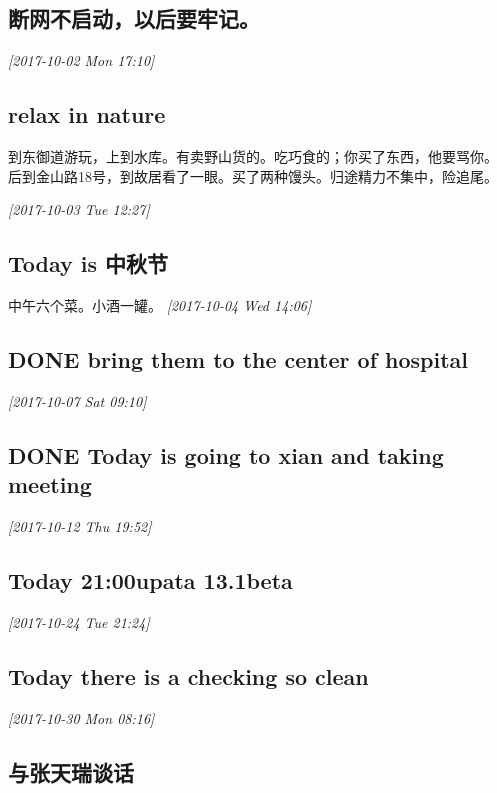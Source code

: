 \documentclass[11pt]{ctexart}
\begin{document}
\subsection{断网不启动，以后要牢记。}
\label{sec:orgc4bcf00}

\textit{[2017-10-02 Mon 17:10]}

\subsection{relax in nature}
\label{sec:org3a22ecf}
到东御道游玩，上到水库。有卖野山货的。吃巧食的；你买了东西，他要骂你。
后到金山路18号，到故居看了一眼。买了两种馒头。归途精力不集中，险追尾。


\textit{[2017-10-03 Tue 12:27]}

\subsection{Today is 中秋节}
\label{sec:org852965e}
中午六个菜。小酒一罐。
\textit{[2017-10-04 Wed 14:06]}

\subsection{{\bfseries\sffamily DONE} bring them to the center of hospital}
\label{sec:orgb7f3a32}
\textit{[2017-10-07 Sat 09:10]}

\subsection{{\bfseries\sffamily DONE} Today is going to xian and taking meeting}
\label{sec:org90e5015}
\textit{[2017-10-12 Thu 19:52]}

\subsection{Today 21:00upata 13.1beta}
\label{sec:orgeaae56d}

\textit{[2017-10-24 Tue 21:24]}

\subsection{Today there is a checking so clean}
\label{sec:org1159140}

\textit{[2017-10-30 Mon 08:16]}

\subsection{与张天瑞谈话}
\label{sec:orga6ce682}
\end{document}
